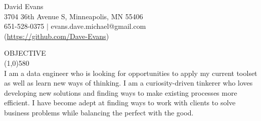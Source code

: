 \documentclass{article}
\begin{document}
\begin{centering}   
\Huge{David Evans} \\
\large{  3704 36th Avenue S, Minneapolis, MN 55406 \\
651-528-0375 $|$ evans.dave.michael@gmail.com} \\
(\href{https://github.com/Dave-Evans}{https://github.com/Dave-Evans}) \\ 
\bigskip

\onehalfspacing
\end{centering}


\noindent \large{OBJECTIVE}\\
\line(1,0){580}\\
I am a data engineer who is looking for opportunities to apply my current toolset as well as learn new ways of thinking.
I am a curiosity-driven tinkerer who loves developing new solutions and finding ways to make existing processes more efficient.
I have become adept at finding ways to work with clients to solve business problems while balancing the perfect with the good.
 \\
\end{document}
